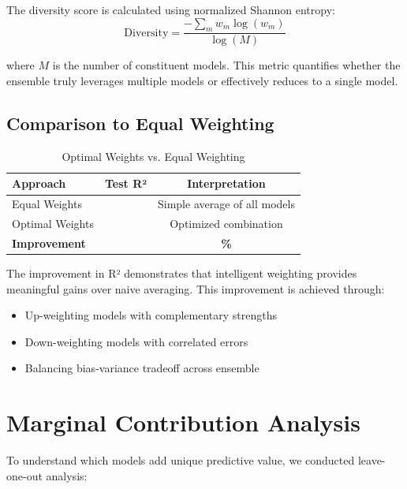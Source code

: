 The diversity score is calculated using normalized Shannon entropy:
\begin{equation}
\text{Diversity} = \frac{-\sum_m w_m \log(w_m)}{\log(M)}
\end{equation}

where $M$ is the number of constituent models. This metric quantifies whether the ensemble truly leverages multiple models or effectively reduces to a single model.

\subsection{Comparison to Equal Weighting}

\begin{table}[h]
\centering
\caption{Optimal Weights vs. Equal Weighting}
\label{tab:model11_vs_equal}
\begin{tabular}{lcc}
\toprule
\textbf{Approach} & \textbf{Test R²} & \textbf{Interpretation} \\
\midrule
Equal Weights & \ModelElevenEqualWeightRSquared{} & Simple average of all models \\
Optimal Weights & \ModelElevenRSquaredTest{} & Optimized combination \\
\midrule
\textbf{Improvement} & \textbf{\ModelElevenImprovementOverEqual{}} & \textbf{\ModelElevenImprovementPct{}\%} \\
\bottomrule
\end{tabular}
\end{table}

The \ModelElevenImprovementOverEqual{} improvement in R² demonstrates that intelligent weighting provides meaningful gains over naive averaging. This improvement is achieved through:
\begin{itemize}
    \item Up-weighting models with complementary strengths
    \item Down-weighting models with correlated errors
    \item Balancing bias-variance tradeoff across ensemble
\end{itemize}

\section{Marginal Contribution Analysis}

To understand which models add unique predictive value, we conducted leave-one-out analysis:


